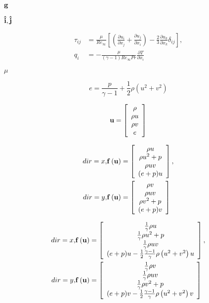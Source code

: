 \documentclass{article}
\begin{document}
${\bf g}$
\pagebreak

${\bf \hat{i}},{\bf \hat{j}}$
\pagebreak

\begin{align} \tau_{ij} &= \frac{\mu}{Re_\infty} \left[ \left( \frac{\partial u_i}{\partial x_j} + \frac{\partial u_j}{\partial x_i}\right) - \frac{2}{3}\frac{\partial u_k}{\partial x_k} \delta_{ij} \right], \\ q_i &= - \frac{\mu}{\left(\gamma-1\right)Re_\infty Pr} \frac{\partial T}{\partial x_i} \end{align}
\pagebreak

$\mu$
\pagebreak

\begin{equation} e = \frac {p} {\gamma-1} + \frac{1}{2} \rho \left(u^2 + v^2\right) \end{equation}
\pagebreak

\begin{equation} {\bf u} = \left[\begin{array}{c} \rho \\ \rho u \\ \rho v \\ e \end{array}\right] \end{equation}
\pagebreak

\begin{eqnarray} dir = x, & {\bf f}\left({\bf u}\right) = \left[\begin{array}{c} \rho u \\ \rho u^2 + p \\ \rho u v \\ (e+p)u \end{array}\right], \\ dir = y, & {\bf f}\left({\bf u}\right) = \left[\begin{array}{c} \rho v \\ \rho u v \\ \rho v^2 + p \\ (e+p)v \end{array}\right] \end{eqnarray}
\pagebreak

\begin{eqnarray} dir = x, & {\bf f}\left({\bf u}\right) = \left[\begin{array}{c} \frac{1}{\gamma}\rho u \\ \frac{1}{\gamma}\rho u^2 + p \\ \frac{1}{\gamma}\rho u v \\ (e+p)u - \frac{1}{2} \frac{\gamma-1}{\gamma}\rho\left(u^2+v^2\right)u \end{array}\right], \\ dir = y, & {\bf f}\left({\bf u}\right) = \left[\begin{array}{c} \frac{1}{\gamma}\rho v \\ \frac{1}{\gamma}\rho u v \\ \frac{1}{\gamma}\rho v^2 + p \\ (e+p)v - \frac{1}{2} \frac{\gamma-1}{\gamma}\rho\left(u^2+v^2\right)v \end{array}\right] \end{eqnarray}
\pagebreak
\end{document}
